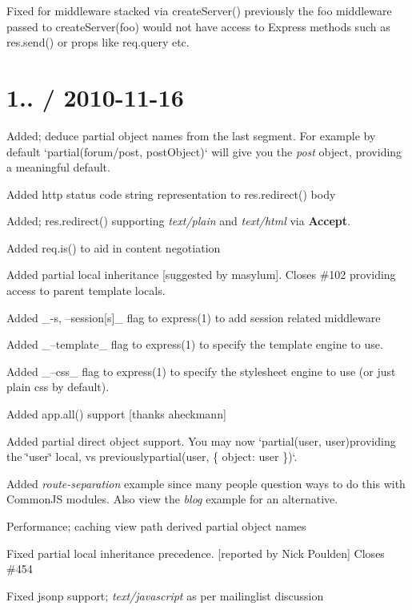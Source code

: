 \begin{DoxyItemize}
\item Fixed for middleware stacked via {\ttfamily create\+Server()} previously the {\ttfamily foo} middleware passed to {\ttfamily create\+Server(foo)} would not have access to Express methods such as {\ttfamily res.\+send()} or props like {\ttfamily req.\+query} etc.
\end{DoxyItemize}

\section*{1.. / 2010-\/11-\/16 }


\begin{DoxyItemize}
\item Added; deduce partial object names from the last segment. For example by default `partial(\textquotesingle{}forum/post\textquotesingle{}, post\+Object)` will give you the {\itshape post} object, providing a meaningful default.
\item Added http status code string representation to {\ttfamily res.\+redirect()} body
\item Added; {\ttfamily res.\+redirect()} supporting {\itshape text/plain} and {\itshape text/html} via {\bfseries Accept}.
\item Added {\ttfamily req.\+is()} to aid in content negotiation
\item Added partial local inheritance \mbox{[}suggested by masylum\mbox{]}. Closes \#102 providing access to parent template locals.
\item Added \+\_\+-\/s, --session\mbox{[}s\mbox{]}\+\_\+ flag to express(1) to add session related middleware
\item Added \+\_\+--template\+\_\+ flag to express(1) to specify the template engine to use.
\item Added \+\_\+--css\+\_\+ flag to express(1) to specify the stylesheet engine to use (or just plain css by default).
\item Added {\ttfamily app.\+all()} support \mbox{[}thanks aheckmann\mbox{]}
\item Added partial direct object support. You may now `partial(\textquotesingle{}user\textquotesingle{}, user){\ttfamily providing the \char`\"{}user\char`\"{} local, vs previously}partial(\textquotesingle{}user\textquotesingle{}, \{ object\+: user \})`.
\item Added {\itshape route-\/separation} example since many people question ways to do this with Common\+J\+S modules. Also view the {\itshape blog} example for an alternative.
\item Performance; caching view path derived partial object names
\item Fixed partial local inheritance precedence. \mbox{[}reported by Nick Poulden\mbox{]} Closes \#454
\item Fixed jsonp support; {\itshape text/javascript} as per mailinglist discussion
\end{DoxyItemize}

